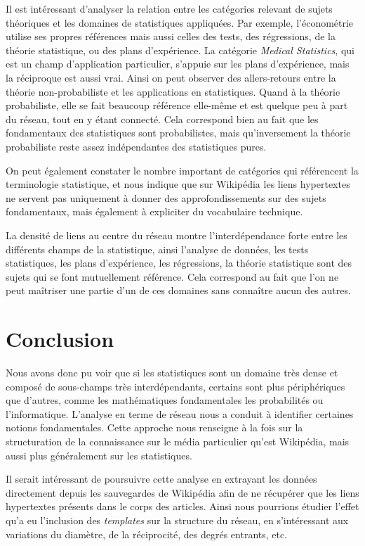 \documentclass[a4paper]{article}
\begin{document}
Il est intéressant d'analyser la relation entre les catégories relevant de sujets théoriques et les domaines de statistiques appliquées. Par exemple, l'économétrie utilise ses propres références mais aussi celles des tests, des régressions, de la théorie statistique, ou des plans d'expérience. La catégorie \textit{Medical Statistics}, qui est un champ d'application particulier, s'appuie sur les plans d'expérience, mais la réciproque est aussi vrai. Ainsi on peut observer des allers-retours entre la théorie non-probabiliste et les applications en statistiques. Quand à la théorie probabiliste, elle se fait beaucoup référence elle-même et est quelque peu à part du réseau, tout en y étant connecté. Cela correspond bien au fait que les fondamentaux des statistiques sont probabilistes, mais qu'inversement la théorie probabiliste reste assez indépendantes des statistiques pures.
 
On peut également constater le nombre important de catégories qui référencent la terminologie statistique, et nous indique que sur Wikipédia les liens hypertextes ne servent pas uniquement à donner des approfondissements sur des sujets fondamentaux, mais également à expliciter du vocabulaire technique.

La densité de liens au centre du réseau montre l'interdépendance forte entre les différents champs de la statistique, ainsi l'analyse de données, les tests statistiques, les plans d'expérience, les régressions, la théorie statistique sont des sujets qui se font mutuellement référence. Cela correspond au fait que l'on ne peut maîtriser une partie d'un de ces domaines sans connaître aucun des autres.


\section{Conclusion} 

Nous avons donc pu voir que si les statistiques sont un domaine très dense et composé de sous-champs très interdépendants, certains sont plus périphériques que d'autres, comme les mathématiques fondamentales les probabilités ou l'informatique. L'analyse en terme de réseau nous a conduit à identifier certaines notions fondamentales. Cette approche nous renseigne à la fois sur la structuration de la connaissance sur le média particulier qu'est Wikipédia, mais aussi plus généralement sur les statistiques.

Il serait intéressant de poursuivre cette analyse en extrayant les données directement depuis les sauvegardes de Wikipédia afin de ne récupérer que les liens hypertextes présents dans le corps des articles. Ainsi nous pourrions étudier l'effet qu'a eu l'inclusion des \textit{templates} sur la structure du réseau, en s'intéressant aux variations du diamètre, de la réciprocité, des degrés entrants, etc.





\end{document}
